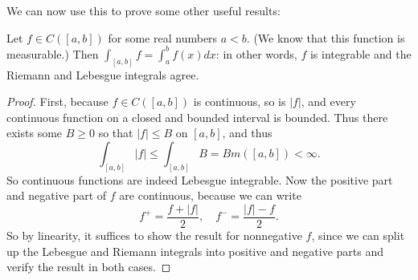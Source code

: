 We can now use this to prove some other useful results:

\begin{theorem}
Let $f \in C([a, b])$ for some real numbers $a < b$. (We know that this function is measurable.) Then $\int_{[a, b]} f = \int_a^b f(x) dx$: in other words, $f$ is integrable and the Riemann and Lebesgue integrals agree. 
\end{theorem}
\begin{proof}
First, because $f \in C([a, b])$ is continuous, so is $|f|$, and every continuous function on a closed and bounded interval is bounded. Thus there exists some $B \ge 0$ so that $|f| \le B$ on $[a, b]$, and thus 
\[
    \int_{[a, b]}|f| \le \int_{[a, b]} B = B m([a, b]) < \infty.
\]
So continuous functions are indeed Lebesgue integrable. Now the positive part and negative part of $f$ are continuous, because we can write 
\[
    f^+ = \frac{f + |f|}{2}, \quad f^- = \frac{|f| - f}{2}.
\]
So by linearity, it suffices to show the result for nonnegative $f$, since we can split up the Lebesgue and Riemann integrals into positive and negative parts and verify the result in both cases. 


\end{proof}
